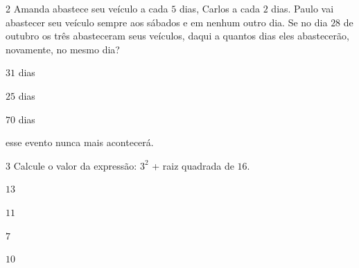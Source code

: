 \num{2}  Amanda abastece seu veículo a cada $5$ dias, Carlos a cada $2$ dias.
Paulo vai abastecer seu veículo sempre aos sábados e em nenhum outro
dia. Se no dia $28$ de outubro os três abasteceram seus veículos, daqui a
quantos dias eles abastecerão, novamente, no mesmo dia?

\begin{escolha}
\item $31$ dias
\item $25$ dias
\item $70$ dias
\item esse evento nunca mais acontecerá.
\end{escolha}




\num{3} Calcule o valor da expressão: $3^2$ + raiz quadrada de $16$.

\begin{escolha}
\item $13$
\item $11$
\item $7$
\item $10$
\end{escolha}


